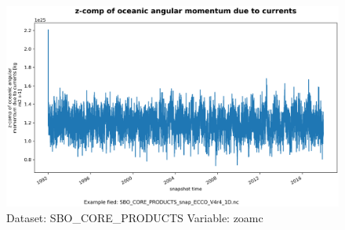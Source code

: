 \begin{figure}[H]
\centering
\includegraphics[width=\textwidth]{../images/plots/oneD_plots/SBO_Core_Products/zoamc.png}
\caption{Dataset: SBO\_CORE\_PRODUCTS Variable: zoamc}
\label{tab:table-SBO_CORE_PRODUCTS_zoamc-Plot}
\end{figure}
\pagebreak
